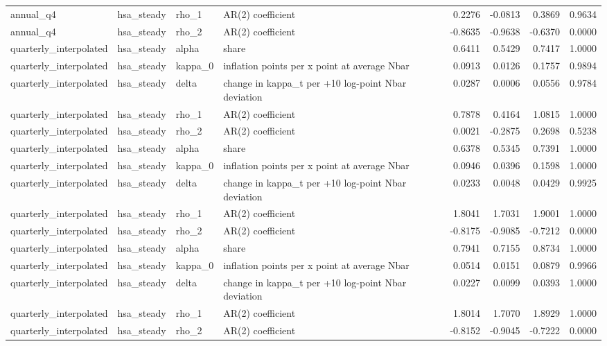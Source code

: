 \begin{tabular}{llllrrrr}
annual\_q4 & hsa\_steady & rho\_1 & AR(2) coefficient & 0.2276 & -0.0813 & 0.3869 & 0.9634 \\
annual\_q4 & hsa\_steady & rho\_2 & AR(2) coefficient & -0.8635 & -0.9638 & -0.6370 & 0.0000 \\
quarterly\_interpolated & hsa\_steady & alpha & share & 0.6411 & 0.5429 & 0.7417 & 1.0000 \\
quarterly\_interpolated & hsa\_steady & kappa\_0 & inflation points per x point at average Nbar & 0.0913 & 0.0126 & 0.1757 & 0.9894 \\
quarterly\_interpolated & hsa\_steady & delta & change in kappa\_t per +10 log-point Nbar deviation & 0.0287 & 0.0006 & 0.0556 & 0.9784 \\
quarterly\_interpolated & hsa\_steady & rho\_1 & AR(2) coefficient & 0.7878 & 0.4164 & 1.0815 & 1.0000 \\
quarterly\_interpolated & hsa\_steady & rho\_2 & AR(2) coefficient & 0.0021 & -0.2875 & 0.2698 & 0.5238 \\
quarterly\_interpolated & hsa\_steady & alpha & share & 0.6378 & 0.5345 & 0.7391 & 1.0000 \\
quarterly\_interpolated & hsa\_steady & kappa\_0 & inflation points per x point at average Nbar & 0.0946 & 0.0396 & 0.1598 & 1.0000 \\
quarterly\_interpolated & hsa\_steady & delta & change in kappa\_t per +10 log-point Nbar deviation & 0.0233 & 0.0048 & 0.0429 & 0.9925 \\
quarterly\_interpolated & hsa\_steady & rho\_1 & AR(2) coefficient & 1.8041 & 1.7031 & 1.9001 & 1.0000 \\
quarterly\_interpolated & hsa\_steady & rho\_2 & AR(2) coefficient & -0.8175 & -0.9085 & -0.7212 & 0.0000 \\
quarterly\_interpolated & hsa\_steady & alpha & share & 0.7941 & 0.7155 & 0.8734 & 1.0000 \\
quarterly\_interpolated & hsa\_steady & kappa\_0 & inflation points per x point at average Nbar & 0.0514 & 0.0151 & 0.0879 & 0.9966 \\
quarterly\_interpolated & hsa\_steady & delta & change in kappa\_t per +10 log-point Nbar deviation & 0.0227 & 0.0099 & 0.0393 & 1.0000 \\
quarterly\_interpolated & hsa\_steady & rho\_1 & AR(2) coefficient & 1.8014 & 1.7070 & 1.8929 & 1.0000 \\
quarterly\_interpolated & hsa\_steady & rho\_2 & AR(2) coefficient & -0.8152 & -0.9045 & -0.7222 & 0.0000 \\

\end{tabular}
